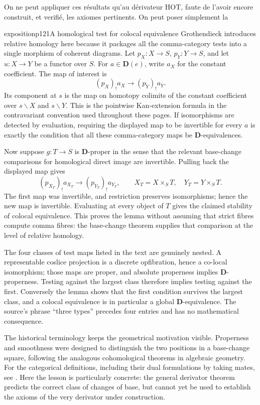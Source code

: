 On ne peut appliquer ces résultats qu'au dérivateur
HOT, faute de l'avoir encore construit, et verifié, les axiomes pertinents. On peut poser %
simplement la

\begin{dcomment}{exposition}{p121}{A homological test for colocal equivalence}
Grothendieck introduces relative homology here because it packages all the comma-category tests into a single morphism of coherent diagrams. Let $p_X:X\to S$, $p_Y:Y\to S$, and let $u:X\to Y$ be a functor over $S$. For $a\in\mathbf D(e)$, write $a_X$ for the constant coefficient. The map of interest is
\[
 (p_X)_!a_X\longrightarrow(p_Y)_!a_Y.
\]
Its component at $s$ is the map on homotopy colimits of the constant coefficient over $s\backslash X$ and $s\backslash Y$. This is the pointwise Kan-extension formula in the contravariant convention used throughout these pages. If isomorphisms are detected by evaluation, requiring the displayed map to be invertible for every $a$ is exactly the condition that all these comma-category maps be $\mathbf D$-equivalences.

Now suppose $g:T\to S$ is $\mathbf D$-proper in the sense that the relevant base-change comparisons for homological direct image are invertible. Pulling back the displayed map gives
\[
 (p_{X_T})_!a_{X_T}\longrightarrow(p_{Y_T})_!a_{Y_T},
 \qquad X_T=X\times_S T,\quad Y_T=Y\times_S T.
\]
The first map was invertible, and restriction preserves isomorphisms; hence the new map is invertible. Evaluating at every object of $T$ gives the claimed stability of colocal equivalence. This proves the lemma without assuming that strict fibres compute comma fibres: the base-change theorem supplies that comparison at the level of relative homology.

The four classes of test maps listed in the text are genuinely nested. A representable coslice projection is a discrete opfibration, hence a co-local isomorphism; those maps are proper, and absolute properness implies $\mathbf D$-properness. Testing against the largest class therefore implies testing against the first. Conversely the lemma shows that the first condition survives the largest class, and a colocal equivalence is in particular a global $\mathbf D$-equivalence. The source's phrase ``three types'' precedes four entries and has no mathematical consequence.

The historical terminology keeps the geometrical motivation visible. Properness and smoothness were designed to distinguish the two positions in a base-change square, following the analogous cohomological theorems in algebraic geometry. For the categorical definitions, including their dual formulations by taking mates, see \citet[Definition~1.1]{Maltsiniotis2005Asphericite}. Here the lesson is particularly concrete: the general derivator theorem predicts the correct class of changes of base, but cannot yet be used to establish the axioms of the very derivator under construction.
\end{dcomment}


